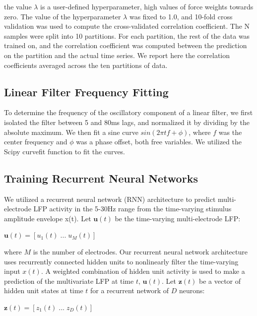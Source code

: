 the value $\lambda$ is a user-defined hyperparameter, high values of force weights towards zero. 
The value of the hyperparameter $\lambda$ was fixed to 1.0, and 10-fold cross validation was used to compute the cross-validated correlation coefficient. The N samples were split into 10 partitions. For each partition, the rest of the data was trained on, and the correlation coefficient was computed between the prediction on the partition and the actual time series. We report here the correlation coefficients averaged across the ten partitions of data.

\subsection{Linear Filter Frequency Fitting}

To determine the frequency of the oscillatory component of a linear filter, we first isolated the filter between 5 and 80ms lags, and normalized it by dividing by the absolute maximum. We then fit a sine curve $sin(2\pi t f + \phi)$, where $f$ was the center frequency and $\phi$ was a phase offset, both free variables. We utilized the Scipy curvefit function to fit the curves.

\subsection{Training Recurrent Neural Networks}

We utilized a recurrent neural network (RNN) architecture to predict multi-electrode LFP activity in the 5-30Hz range from the time-varying stimulus amplitude envelope x(t). Let $\textbf{u}(t)$ be the time-varying multi-electrode LFP:

\begin{center}
$\textbf{u}(t) = [u_1 (t) \; ... \; u_M (t)]$
\end{center}

where $M$ is the number of electrodes. Our recurrent neural network architecture uses recurrently connected hidden units to nonlinearly filter the time-varying input $x(t)$. A weighted combination of hidden unit activity is used to make a prediction of the multivariate LFP at time $t$, $\textbf{u}(t)$. Let $\textbf{z}(t)$ be a vector of hidden unit states at time $t$ for a recurrent network of $D$ neurons:

\begin{center}
$\textbf{z}(t) = [z_1 (t) \; ... \; z_D (t)]$
\end{center}

